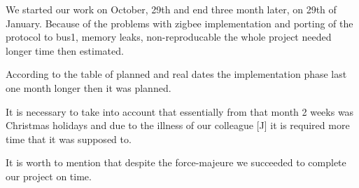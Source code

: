 \documentclass{scrreprt}
\begin{document}
We started our work on October, 29th and end three month later, on 29th of January.
Because of the  problems with zigbee implementation and porting of the protocol to bus1,
memory leaks, non-reproducable 
the whole project needed longer time then estimated.

According to the table of planned and real dates the implementation phase
last one month longer then it was planned.

It is necessary to take into account that essentially from that month 
2 weeks was Christmas holidays and due to the illness of our colleague [J]
it is required more time that it was supposed to.


It is worth to mention that despite the force-majeure we succeeded to complete 
our project on time.

\vspace{0.2in}
\end{document}
